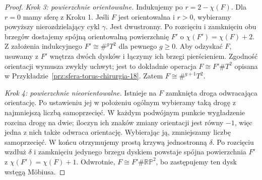 \begin{proof}
\emph{Krok 3: powierzchnie orientowalne.}
Indukujemy po $r=2-\chi(F)$. Dla $r=0$
mamy sferę z Kroku 1. Jeśli $F$ jest
orientowalna i $r>0$, wybieramy powyższy
nierozdzielający cykl $\gamma$. Jest dwustronny.
Po rozcięciu i zamknięciu obu brzegów
dostajemy spójną orientowalną powierzchnię
$F'$ o $\chi(F')=\chi(F)+2$.
Z założenia indukcyjnego $F'\cong\#^gT^2$
dla pewnego $g\geq0$. Aby odzyskać $F$,
usuwamy z $F'$ wnętrza dwóch dysków i
łączymy ich brzegi pierścieniem.
Zgodność orientacji wymusza zwykły
uchwyt; jest to dokładnie operacja
$F\cong F'\#T^2$ opisana w
Przykładzie~\ref{prz:sfera-torus-chirurgia-18}.
Zatem $F\cong\#^{g+1}T^2$.

\emph{Krok 4: powierzchnie nieorientowalne.}
Istnieje na $F$ zamknięta droga odwracająca
orientację. Po ustawieniu jej w położeniu
ogólnym wybieramy taką drogę z najmniejszą
liczbą samoprzecięć. W każdym podwójnym
punkcie wygładzenie rozcina drogę na dwie;
iloczyn ich znaków zmiany orientacji jest
równy $-1$, więc jedna z nich także odwraca
orientację. Wybierając ją, zmniejszamy
liczbę samoprzecięć. W końcu otrzymujemy
prostą krzywą jednostronną $\delta$.
Po rozcięciu wzdłuż $\delta$ i zamknięciu
jedynego brzegu dyskiem powstaje spójna
powierzchnia $F'$ z $\chi(F')=\chi(F)+1$.
Odwrotnie, $F\cong F'\#\mathbb{RP}^2$,
bo zastępujemy ten dysk wstęgą Möbiusa.


\end{proof}
